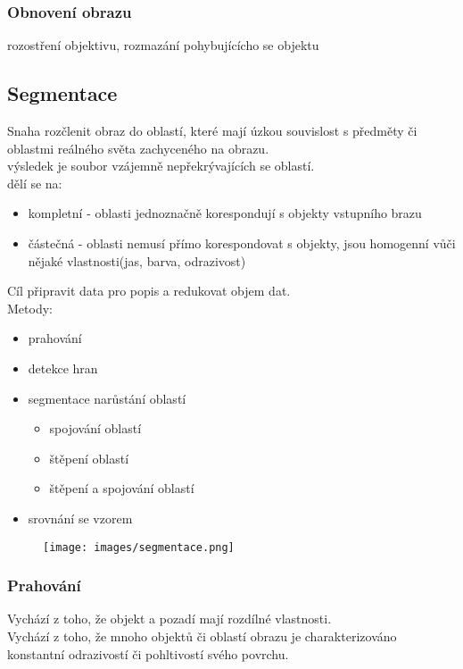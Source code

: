 \subsubsection{Obnovení obrazu}
rozostření objektivu, rozmazání pohybujícícho se objektu\\

\subsection{Segmentace}
Snaha rozčlenit obraz do oblastí, které mají úzkou souvislost s předměty či oblastmi reálného světa zachyceného na obrazu.\\
výsledek je soubor vzájemně nepřekrývajících se oblastí.\\
dělí se na:
\begin{itemize}
    \item kompletní - oblasti jednoznačně korespondují s objekty vstupního brazu
    \item částečná - oblasti nemusí přímo korespondovat s objekty, jsou homogenní vůči nějaké vlastnosti(jas, barva, odrazivost)
\end{itemize}
Cíl připravit data pro popis a redukovat objem dat.\\
Metody:
\begin{itemize}
    \item prahování
    \item detekce hran
    \item segmentace narůstání oblastí
          \begin{itemize}
              \item spojování oblastí
              \item štěpení oblastí
              \item štěpení a spojování oblastí
          \end{itemize}
    \item srovnání se vzorem
\end{itemize}
\begin{figure}[H]
    \texttt{[image: images/segmentace.png]}
\end{figure}

\subsubsection{Prahování}
Vychází z toho, že objekt a pozadí mají rozdílné vlastnosti.\\
Vychází z toho, že mnoho objektů či oblastí obrazu je charakterizováno konstantní odrazivostí či pohltivostí svého povrchu.\\


